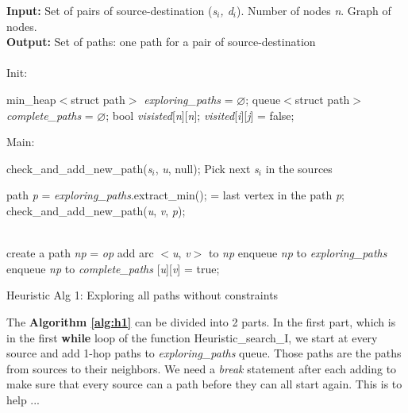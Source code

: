 \begin{algorithm}[!htp]
\textbf{Input:} Set of pairs of source-destination (\textit{s$_i$, d$_i$}). Number of nodes \textit{n}. Graph of nodes. \\
\textbf{Output:} Set of paths: one path for a pair of source-destination \\
\\
Init:
    \begin{algorithmic}
	\State min\_heap$<$struct path$>$ \textit{exploring\_paths} = $\varnothing$;
	\State queue$<$struct path$>$ \textit{complete\_paths} = $\varnothing$;
	\State bool \textit{visisted}[\textit{n}][\textit{n}];
	    \State \textit{visited}[{\it i}][{\it j}] = false;
	\EndFor
    \end{algorithmic}
Main:

\begin{algorithmic}

	\State check\_and\_add\_new\_path({\it s}$_i$, \textit{u}, null);
	\State Pick next \textit{s$_i$} in the sources
    \EndWhile

	\State path \textit{p} = \textit{exploring\_paths}.extract\_min();
	 = last vertex in the path {\it p};
	    \State check\_and\_add\_new\_path({\it u}, \textit{v}, {\it p});
	\EndFor
    \EndWhile

    \EndFunction
\\
	    \State create a path \textit{np} = {\it op}
	    \State add arc $<$\textit{u}, \textit{v}$>$ to \textit{np}
	    \State enqueue \textit{np} to \textit{exploring\_paths}
	        \State enqueue \textit{np} to \textit{complete\_paths}
            \EndIf
	    [\textit{u}][\textit{v}] = true;
	\EndIf
    \EndFunction
\end{algorithmic}

\caption{Heuristic Alg 1: Exploring all paths without constraints}
\label{alg:h1}

\end{algorithm}

The \textbf{Algorithm \ref{alg:h1}} can be divided into 2 parts. In the first part, which is in the first \textbf{while} loop of the function Heuristic\_search\_I, we start at every source and add 1-hop paths to \textit{exploring\_paths} queue. Those paths are the paths from sources to their neighbors. We need a \textit{break} statement after each adding to make sure that every source can a path before they can all start again. This is to help ...

